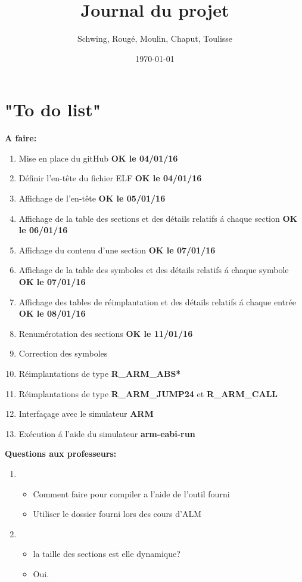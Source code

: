 \documentclass[12pt, a4paper]{article}
\title{Journal du projet}
\author{Schwing, Roug\'e, Moulin, Chaput, Toulisse}
\date{\today}
\begin{document}
\maketitle

\section{"To do list"}
\textbf{A faire:}
\begin{enumerate}
\item Mise en place du gitHub \textbf{OK le 04/01/16} 
\item Définir l'en-t\^ete du fichier ELF \textbf{OK le 04/01/16}
\item Affichage de l'en-t\^ete \textbf{OK le 05/01/16} 
\item Affichage de la table des sections et des détails
	relatifs \'a chaque section \textbf{OK le 06/01/16} 
\item Affichage du contenu d'une section \textbf{OK le 07/01/16} 
\item Affichage de la table des symboles et des détails relatifs 
	\'a chaque symbole \textbf{OK le 07/01/16} 
\item Affichage des tables de réimplantation et des détails relatifs 
	\'a chaque entrée \textbf{OK le 08/01/16} 
\item Renumérotation des sections \textbf{OK le 11/01/16} 
\item Correction des symboles
\item Réimplantations de type \textbf{R\_ARM\_ABS*}
\item Réimplantations de type \textbf{R\_ARM\_JUMP24} et 
	\textbf{R\_ARM\_CALL}
\item Interfaçage avec le simulateur \textbf{ARM}
\item Exécution \'a l'aide du simulateur \textbf{arm-eabi-run}
\end{enumerate}

\textbf{Questions aux professeurs:}
\begin{enumerate}
\item 
	\begin{itemize}
		\item Comment faire pour compiler a l'aide de l'outil fourni
		\item Utiliser le dossier fourni lors des cours d'ALM
	\end{itemize}
\item 
	\begin{itemize}
		\item la taille des sections est elle dynamique?
		\item Oui.
	\end{itemize}
\end{enumerate}
\end{document}
